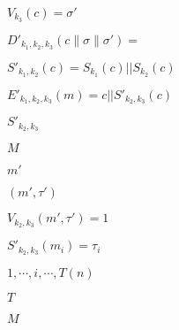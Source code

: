\documentclass[10pt]{book}
\begin{document}
\begin{mdSnippets}
\begin{mdInlineSnippet}[73c9ec4c45c3942c02cf50d63e28eeb8]
$V_{k_3}(c)=\sigma'$\end{mdInlineSnippet}%
\begin{mdInlineSnippet}[8f7f844c9b084b0e07dbca89f181868a]%
$D'_{k_1,k_2,k_3}(c\|\sigma\|\sigma')=$\end{mdInlineSnippet}%
\begin{mdInlineSnippet}[a5f9997d3fd0d25c2bfc20f70fd71865]%
$S'_{k_1,k_2}(c) = S_{k_1}(c) || S_{k_2}(c)$\end{mdInlineSnippet}%
\begin{mdInlineSnippet}[17a6118d6cb829932ff7ac14e0ad9d0f]%
$E'_{k_1,k_2,k_3}(m) = c || S'_{k_2,k_3}(c)$\end{mdInlineSnippet}%
\begin{mdInlineSnippet}[2241c878d01fb10bcb89591e5e72a22e]%
$S'_{k_2,k_3}$\end{mdInlineSnippet}%
\begin{mdInlineSnippet}[69691c7bdcc3ce6d5d8a1361f22d04ac]%
$M$\end{mdInlineSnippet}%
\begin{mdInlineSnippet}%
$m'$\end{mdInlineSnippet}%
\begin{mdInlineSnippet}[761491c241fd4d2d79a17a02e0811a53]%
$(m',\tau')$\end{mdInlineSnippet}%
\begin{mdInlineSnippet}%
$V_{k_2,k_3}(m', \tau') = 1$\end{mdInlineSnippet}%
\begin{mdInlineSnippet}[6698e2dc8709e51a47b712c41d5f9da3]%
$S'_{k_2,k_3}(m_i) = \tau_i$\end{mdInlineSnippet}%
\begin{mdInlineSnippet}[7f7d2fd5d10e450bfad309e2288f9e2b]%
$1,\cdots,i,\cdots, T(n)$\end{mdInlineSnippet}%
\begin{mdInlineSnippet}%
$T$\end{mdInlineSnippet}%
\begin{mdInlineSnippet}[69691c7bdcc3ce6d5d8a1361f22d04ac]%
$M$\end{mdInlineSnippet}%

\end{mdSnippets}
\end{document}
